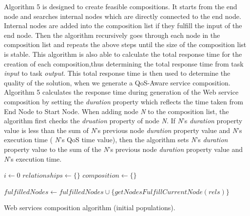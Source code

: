 Algorithm 5 is designed to create feasible compositions. It starts from the end node and searches internal nodes which are directly connected to the end node. Internal nodes are added into the composition list if they fulfill the input of the end node. Then the algorithm recursively goes through each node in the composition list and repeats the above steps until the size of the composition list is stable. This algorithm is also able to calculate the total response time for the creation of each composition,thus determining the total response time from task \emph{input} to task \emph{output}. This total  response time is then used to determine the quality of the solution, when we generate a QoS-Aware service composition. Algorithm 5 calculates the response time during generation of the Web service composition by setting the \emph{duration} property which reflects the time taken from End Node to Start Node. When adding node \emph{N} to the composition list, the algorithm first checks the \emph{druation} property of node \emph{N}. If \emph{N}'s \emph{duration} property value is less than the sum of \emph{N}'s previous node  \emph{duration} property value and  \emph{N}'s execution time ( \emph{N}'s QoS time value), then the algorithm sets  \emph{N}'s \emph{duration} property value to the sum of the  \emph{N}'s previous node \emph{duration} property value and  \emph{N}'s execution time.\par

\begin{algorithm}[H]
 \LinesNumbered
 \SetNlSty{}{}{:}
   $i \leftarrow 0$\;
   $relationships \leftarrow \{\}$\;
   $composition \leftarrow \{\}$\; 

   $fulfilledNodes \leftarrow fulfilledNodes \cup \{getNodesFulfillCurrentNode(rels)\}$\;
 \caption{\footnotesize Web services composition algorithm (initial populations).}
\label{generation}
\end{algorithm}

